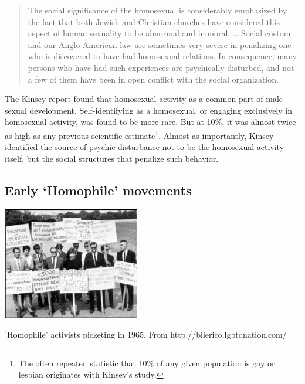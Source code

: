 \begin{refsection}
\begin{quote}

The social significance of the homosexual is considerably emphasized by the fact that both Jewish and Christian churches have considered this aspect of human sexuality to be abnormal and immoral. {\ldots} Social custom and our Anglo-American law are sometimes very severe in penalizing one who is discovered to have had homosexual relations. In consequence, many persons who have had such experiences are psychically disturbed, and not a few of them have been in open conflict with the social organization. ~\citep[p. 610]{Kinsey:1998ur}
\end{quote}

The Kinsey report found that homosexual activity as a common part of male sexual development. Self-identifying as a homosexual, or engaging exclusively in homosexual activity, was found to be more rare. But at 10\%, it was almost twice as high as any previous scientific estimate\footnote{The often repeated statistic that 10\% of any given population is gay or lesbian originates with Kinsey's study.}. Almost as importantly, Kinsey identified the source of psychic disturbance not to be the homosexual activity itself, but the social structures that penalize such behavior.

\subsection{Early `Homophile' movements}
\label{earlyhomophilemovements}

\begin{marginfigure}
 \begin{center}

     \includegraphics{../images/1965-gay-Picket-thumb-225x186-17508.png}
\end{center}
 \caption{'Homophile' activists picketing in 1965. From http://bilerico.lgbtqnation.com/}
\label{fig: 1965Picket}
\end{marginfigure}



\end{refsection}
